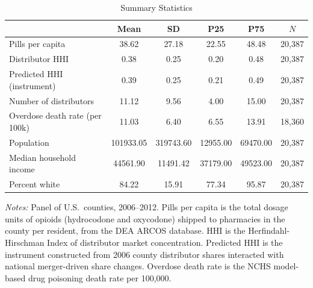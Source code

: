 \begin{table}[htbp]
\centering
\caption{Summary Statistics}
\label{tab:summary}
\begin{threeparttable}
\begin{tabular}{lccccc}
\hline\hline
 & Mean & SD & P25 & P75 & $N$ \\
\hline
Pills per capita & 38.62 & 27.18 & 22.55 & 48.48 & 20,387 \\
Distributor HHI & 0.38 & 0.25 & 0.20 & 0.48 & 20,387 \\
Predicted HHI (instrument) & 0.39 & 0.25 & 0.21 & 0.49 & 20,387 \\
Number of distributors & 11.12 & 9.56 & 4.00 & 15.00 & 20,387 \\
Overdose death rate (per 100k) & 11.03 & 6.40 & 6.55 & 13.91 & 18,360 \\
Population & 101933.05 & 319743.60 & 12955.00 & 69470.00 & 20,387 \\
Median household income & 44561.90 & 11491.42 & 37179.00 & 49523.00 & 20,387 \\
Percent white & 84.22 & 15.91 & 77.34 & 95.87 & 20,387 \\
\hline\hline
\end{tabular}
\begin{tablenotes}[flushleft]
\small
\item \textit{Notes:} Panel of U.S.\ counties, 2006--2012. Pills per capita is the total dosage units of opioids (hydrocodone and oxycodone) shipped to pharmacies in the county per resident, from the DEA ARCOS database. HHI is the Herfindahl-Hirschman Index of distributor market concentration. Predicted HHI is the instrument constructed from 2006 county distributor shares interacted with national merger-driven share changes. Overdose death rate is the NCHS model-based drug poisoning death rate per 100,000.
\end{tablenotes}
\end{threeparttable}
\end{table}

